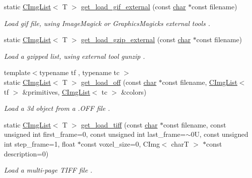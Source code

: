 \begin{DoxyCompactItemize}
static \hyperlink{structcimg__library__suffixed_1_1CImgList}{C\+Img\+List}$<$ T $>$ \hyperlink{structcimg__library__suffixed_1_1CImgList_a74ba3fead6216d5b931e19f485386701}{get\+\_\+load\+\_\+gif\+\_\+external} (const \hyperlink{classchar}{char} $\ast$const filename)
\begin{DoxyCompactList}\small\item\em Load gif file, using Image\+Magick or Graphics\+Magick\textquotesingle{}s external tools . \end{DoxyCompactList}\item 
\mbox{\label{structcimg__library__suffixed_1_1CImgList_ab02322e8fdea065abe492abba5ade0d1}} 
static \hyperlink{structcimg__library__suffixed_1_1CImgList}{C\+Img\+List}$<$ T $>$ \hyperlink{structcimg__library__suffixed_1_1CImgList_ab02322e8fdea065abe492abba5ade0d1}{get\+\_\+load\+\_\+gzip\+\_\+external} (const \hyperlink{classchar}{char} $\ast$const filename)
\begin{DoxyCompactList}\small\item\em Load a gzipped list, using external tool \textquotesingle{}gunzip\textquotesingle{} . \end{DoxyCompactList}\item 
\mbox{\label{structcimg__library__suffixed_1_1CImgList_a10fc2319206b28866aeb23142a9f15c8}} 
{\footnotesize template$<$typename tf , typename tc $>$ }\\static \hyperlink{structcimg__library__suffixed_1_1CImgList}{C\+Img\+List}$<$ T $>$ \hyperlink{structcimg__library__suffixed_1_1CImgList_a10fc2319206b28866aeb23142a9f15c8}{get\+\_\+load\+\_\+off} (const \hyperlink{classchar}{char} $\ast$const filename, \hyperlink{structcimg__library__suffixed_1_1CImgList}{C\+Img\+List}$<$ tf $>$ \&primitives, \hyperlink{structcimg__library__suffixed_1_1CImgList}{C\+Img\+List}$<$ tc $>$ \&colors)
\begin{DoxyCompactList}\small\item\em Load a 3d object from a .O\+FF file . \end{DoxyCompactList}\item 
\mbox{\label{structcimg__library__suffixed_1_1CImgList_ac8916960cc248f5ef7dbb238bb218540}} 
static \hyperlink{structcimg__library__suffixed_1_1CImgList}{C\+Img\+List}$<$ T $>$ \hyperlink{structcimg__library__suffixed_1_1CImgList_ac8916960cc248f5ef7dbb238bb218540}{get\+\_\+load\+\_\+tiff} (const \hyperlink{classchar}{char} $\ast$const filename, const unsigned int first\+\_\+frame=0, const unsigned int last\+\_\+frame=$\sim$0\+U, const unsigned int step\+\_\+frame=1, float $\ast$const voxel\+\_\+size=0, C\+Img$<$ char\+T $>$ $\ast$const description=0)
\begin{DoxyCompactList}\small\item\em Load a multi-\/page T\+I\+FF file . \end{DoxyCompactList}\end{DoxyCompactItemize}
